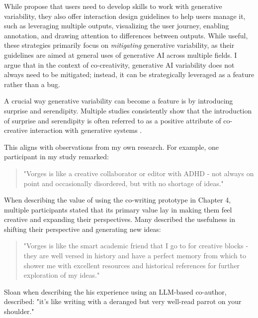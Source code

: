 While \cite{Weisz2024-io} propose that users need to develop skills to work with generative variability, they also offer interaction design guidelines to help users manage it, such as leveraging multiple outputs, visualizing the user journey, enabling annotation, and drawing attention to differences between outputs. While useful, these strategies primarily focus on \textit{mitigating} generative variability, as their guidelines are aimed at general uses of generative AI across multiple fields. I argue that in the context of co-creativity, generative AI variability does not always need to be mitigated; instead, it can be strategically leveraged as a feature rather than a bug.

A crucial way generative variability can become a feature is by introducing surprise and serendipity. Multiple studies consistently show that the introduction of surprise and serendipity is often referred to as a positive attribute of co-creative interaction with generative systems \cite{Lawton2023-tb, Chiou2023-vr, Louie2020-aq, Moruzzi2022-gp, Park2024-gw, Koch2020-gx}.

This aligns with observations from my own research. For example, one participant in my study remarked:

\begin{quote}
"Vorges is like a creative collaborator or editor with ADHD - not always on point and occasionally disordered, but with no shortage of ideas."
\end{quote}

When describing the value of using the co-writing prototype in Chapter 4, multiple participants stated that its primary value lay in making them feel creative and expanding their perspectives. Many described the usefulness in shifting their perspective and generating new ideas:

\begin{quote}
"Vorges is like the smart academic friend that I go to for creative blocks - they are well versed in history and have a perfect memory from which to shower me with excellent resources and historical references for further exploration of my ideas."
\end{quote}

Sloan \cite{Sloan2016-fj} when describing the his experience using an LLM-based co-author, described: "it’s like writing with a deranged but very well-read parrot on your shoulder."

